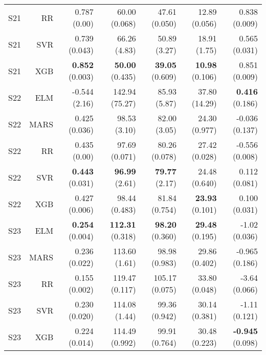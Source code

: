 \begin{table}
\begin{tabular}{rrrrrrr}
    S21 &        RR &                        0.787 (0.00) &             60.00 (0.068) &           47.61 (0.050) &           12.89 (0.056) &         0.838 (0.009) \\
    S21 &       SVR &                       0.739 (0.043) &              66.26 (4.83) &            50.89 (3.27) &            18.91 (1.75) &         0.565 (0.031) \\
    S21 &       XGB &                { \bf 0.852} (0.003) &      { \bf 50.00} (0.435) &    { \bf 39.05} (0.609) &    { \bf 10.98} (0.106) &         0.851 (0.009) \\
    S22 &       ELM &                       -0.544 (2.16) &            142.94 (75.27) &            85.93 (5.87) &           37.80 (14.29) &  { \bf 0.416} (0.186) \\
    S22 &      MARS &                       0.425 (0.036) &              98.53 (3.10) &            82.00 (3.05) &           24.30 (0.977) &        -0.036 (0.137) \\
    S22 &        RR &                        0.435 (0.00) &             97.69 (0.071) &           80.26 (0.078) &           27.42 (0.028) &        -0.556 (0.008) \\
    S22 &       SVR &                { \bf 0.443} (0.031) &       { \bf 96.99} (2.61) &     { \bf 79.77} (2.17) &           24.48 (0.640) &         0.112 (0.081) \\
    S22 &       XGB &                       0.427 (0.006) &             98.44 (0.483) &           81.84 (0.754) &    { \bf 23.93} (0.101) &         0.100 (0.031) \\
    S23 &       ELM &                { \bf 0.254} (0.004) &     { \bf 112.31} (0.318) &    { \bf 98.20} (0.360) &    { \bf 29.48} (0.195) &         -1.02 (0.036) \\
    S23 &      MARS &                       0.236 (0.022) &             113.60 (1.61) &           98.98 (0.983) &           29.86 (0.402) &        -0.965 (0.186) \\
    S23 &        RR &                       0.155 (0.002) &            119.47 (0.117) &          105.17 (0.075) &           33.80 (0.048) &         -3.64 (0.066) \\
    S23 &       SVR &                       0.230 (0.020) &             114.08 (1.44) &           99.36 (0.942) &           30.14 (0.381) &         -1.11 (0.121) \\
    S23 &       XGB &                       0.224 (0.014) &            114.49 (0.992) &           99.91 (0.764) &           30.48 (0.223) & { \bf -0.945} (0.098) \\

\end{tabular}
\end{table}
